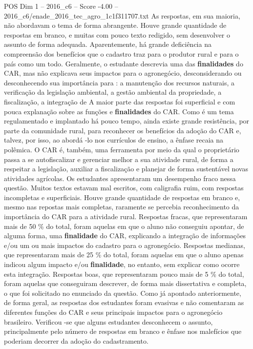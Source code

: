 \begin{textsample}{POS Dim 1 – 2016\_c6 – Score -4.00 – 2016\_c6/enade\_2016\_tec\_agro\_1c1f311707.txt}
As respostas, em sua maioria, não abordavam o tema de forma abrangente.
Houve grande quantidade de respostas em branco, e muitas com pouco texto redigido, sem desenvolver o assunto de forma adequada.
Aparentemente, há grande deficiência na compreensão dos benefícios que o cadastro traz para o produtor rural e para o país como um todo.
Geralmente, o estudante descrevia uma das \textbf{finalidades} do CAR, mas não explicava seus impactos para o agronegócio, desconsiderando ou desconhecendo sua importância para : a manutenção dos recursos naturais, a verificação da legislação ambiental, a gestão ambiental da propriedade, a fiscalização, a integração de A maior parte das respostas foi superficial e com pouca explanação sobre as funções e \textbf{finalidades} do CAR.
Como é um tema regulamentado e implantado há pouco tempo, ainda existe grande resistência, por parte da comunidade rural, para reconhecer os benefícios da adoção do CAR e, talvez, por isso, ao abordá -lo nos currículos de ensino, a ênfase recaia na polêmica.
O CAR é, também, uma ferramenta por meio da qual o proprietário passa a se autofiscalizar e gerenciar melhor a sua atividade rural, de forma a respeitar a legislação, auxiliar a fiscalização e planejar de forma sustentável novas atividades agrícolas.
Os estudantes apresentaram um desempenho fraco nessa questão.
Muitos textos estavam mal escritos, com caligrafia ruim, com respostas incompletas e superficiais.
Houve grande quantidade de respostas em branco e, mesmo nas repostas mais completas, raramente se percebia reconhecimento da importância do CAR para a atividade rural.
Respostas fracas, que representaram mais de 50 \% do total, foram aquelas em que o aluno não conseguiu apontar, de alguma forma, uma \textbf{finalidade} do CAR, explicando a integração de informações e/ou um ou mais impactos do cadastro para o agronegócio.
Respostas medianas, que representaram mais de 25 \% do total, foram aquelas em que o aluno apenas indicou algum impacto e/ou \textbf{finalidade}, no entanto, sem explicar como ocorre esta integração.
Respostas boas, que representaram pouco mais de 5 \% do total, foram aquelas que conseguiram descrever, de forma mais dissertativa e completa, o que foi solicitado no enunciado da questão.
Como já apontado anteriormente, de forma geral, as respostas dos estudantes foram evasivas e não comentaram as diferentes funções do CAR e seus principais impactos para o agronegócio brasileiro.
Verificou -se que alguns estudantes desconhecem o assunto, principalmente pelo número de respostas em branco e ênfase nos malefícios que poderiam decorrer da adoção do cadastramento.

\end{textsample}

